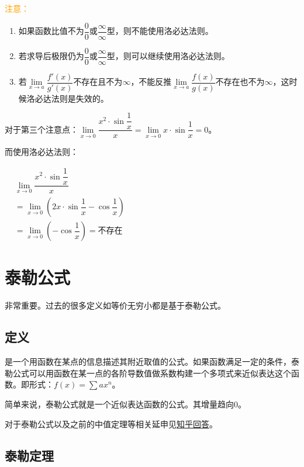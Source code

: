 \documentclass[UTF8, 12pt]{ctexart}
\begin{document}
\textcolor{orange}{注意：}

\begin{enumerate}
    \item 如果函数比值不为$\dfrac{0}{0}$或$\dfrac{\infty}{\infty}$型，则不能使用洛必达法则。
    \item 若求导后极限仍为$\dfrac{0}{0}$或$\dfrac{\infty}{\infty}$型，则可以继续使用洛必达法则。
    \item 若$\lim\limits_{x\to a}\dfrac{f'(x)}{g'(x)}$不存在且不为$\infty$，不能反推$\lim\limits_{x\to a}\dfrac{f(x)}{g(x)}$不存在也不为$\infty$，这时候洛必达法则是失效的。
\end{enumerate}

对于第三个注意点：$\lim\limits_{x\to 0}\dfrac{x^2\cdot\sin\dfrac{1}{x}}{x}=\lim\limits_{x\to 0}x\cdot\sin\dfrac{1}{x}=0$。

而使用洛必达法则：

$
\begin{aligned}
    & \lim\limits_{x\to 0}\dfrac{x^2\cdot\sin\dfrac{1}{x}}{x} \\
    & =\lim\limits_{x\to 0}\left(2x\cdot\sin\dfrac{1}{x}-\cos\dfrac{1}{x}\right) \\
    & =\lim\limits_{x\to 0}\left(-\cos\dfrac{1}{x}\right)=\text{不存在}
\end{aligned}
$

\section{泰勒公式}

非常重要。过去的很多定义如等价无穷小都是基于泰勒公式。

\subsection{定义}

是一个用函数在某点的信息描述其附近取值的公式。如果函数满足一定的条件，泰勒公式可以用函数在某一点的各阶导数值做系数构建一个多项式来近似表达这个函数。即形式：$f(x)=\sum ax^n$。

简单来说，泰勒公式就是一个近似表达函数的公式。其增量趋向0。

对于泰勒公式以及之前的中值定理等相关延申见\href{https://www.zhihu.com/question/25627482}{知乎回答}。

\subsection{泰勒定理}
\end{document}
